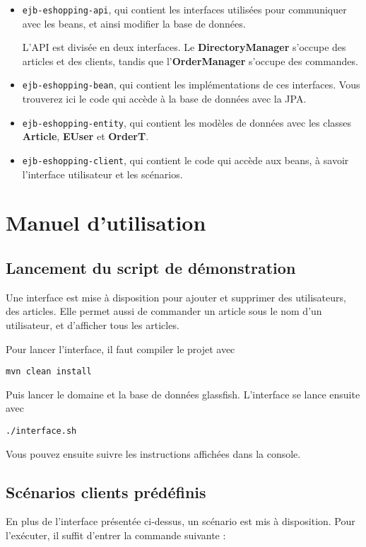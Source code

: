 \documentclass[12pt]{article}
\begin{document}
\begin{itemize}
    \item \texttt{ejb-eshopping-api}, qui contient les interfaces utilisées pour communiquer avec les beans, et ainsi modifier la base de données.
        
        L'API est divisée en deux interfaces. Le \textbf{DirectoryManager} s'occupe des articles et des clients, tandis que l'\textbf{OrderManager} s'occupe des commandes.

    \item \texttt{ejb-eshopping-bean}, qui contient les implémentations de ces interfaces. Vous trouverez ici le code qui accède à la base de données avec la JPA.

    \item \texttt{ejb-eshopping-entity}, qui contient les modèles de données avec les classes \textbf{Article}, \textbf{EUser} et \textbf{OrderT}.

    \item \texttt{ejb-eshopping-client}, qui contient le code qui accède aux beans, à savoir l'interface utilisateur et les scénarios.
\end{itemize}

\section{Manuel d'utilisation}
    \subsection{Lancement du script de démonstration}
    Une interface est mise à disposition pour ajouter et supprimer des utilisateurs, des articles.
    Elle permet aussi de commander un article sous le nom d'un utilisateur, et d'afficher tous les articles.

    Pour lancer l'interface, il faut compiler le projet avec

    \texttt{mvn clean install}

    Puis lancer le domaine et la base de données glassfish. L'interface se lance ensuite avec

    \texttt{./interface.sh}

    Vous pouvez ensuite suivre les instructions affichées dans la console.

    \subsection{Scénarios clients prédéfinis}
    En plus de l'interface présentée ci-dessus, un scénario est mis à disposition. Pour l'exécuter, il suffit d'entrer la commande suivante :
\end{document}
